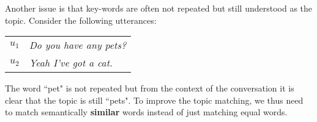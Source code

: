 Another issue is that key-words are often not repeated but still understood as the topic. Consider the following \glspl{utterance}:

\begin{table}[h]
    \begin{tabular}{l|l}
    $u_1$     & \textit{Do you have any pets?}                    \\
    $u_2$     & \textit{Yeah I've got a cat.}                        \\
    \end{tabular}
\end{table}

The word ``pet" is not repeated  but from the context of the conversation it is clear that the topic is still ``pets". To improve the topic matching, we thus need to match semantically \textbf{similar} words instead of just matching equal words.